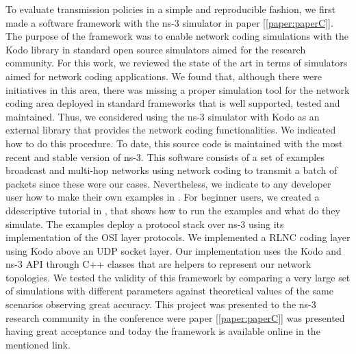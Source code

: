 To evaluate transmission policies in a simple and reproducible fashion, we first made a software framework with the ns-3 simulator \cite{kodons3link,kodons3tutorial} in paper {[\ref{paper:paperC}]}. The purpose of the framework was to enable network coding simulations with the Kodo library in standard open source simulators aimed for the research community. For this work, we reviewed the state of the art in terms of simulators aimed for network coding applications. We found that, although there were initiatives in this area, there was missing a proper simulation tool for the network coding area deployed in standard frameworks that is well supported, tested and maintained. Thus, we considered using the ns-3 simulator with Kodo as an external library that provides the network coding functionalities. We indicated how to do this procedure. To date, this source code is maintained with the most recent and stable version of ns-3. This software consists of a set of examples broadcast and multi-hop networks using network coding to transmit a batch of packets since these were our cases. Nevertheless, we indicate to any developer user how to make their own examples in \cite{kodons3link}. For beginner users, we created a ddescriptive tutorial in \cite{kodons3tutorial}, that shows how to run the examples and what do they simulate. The examples deploy a protocol stack over ns-3 using its implementation of the \ac{OSI} layer protocols. We implemented a \ac{RLNC} coding layer using Kodo above an \ac{UDP} socket layer. Our implementation uses the Kodo and ns-3 \ac{API} through C++ classes that are helpers to represent our network topologies. We tested the validity of this framework by comparing a very large set of simulations with different parameters against theoretical values of the same scenarios observing great accuracy. This project was presented to the ns-3 research community in the conference were paper {[\ref{paper:paperC}]} was presented having great acceptance and today the framework is available online in the mentioned link.


